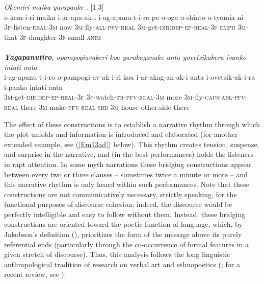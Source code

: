 \documentclass[output=paper]{LSP/langsci}
\begin{document}
\begin{exe}
\ex \label{Em03ab}
\begin{xlist}
\ex \label{Emex:03a}
\glt \textit{Okemiri maika yarapaake \underline{}}. [1.3]\\
\gll o-kem-i-ri maika i-ar-apa-ak-i i-ag-apanu-t-i-ro pe o-oga o-shinto o-tyomia-ni\\
 \textsc{3f-}listen\textsc{-real-3m} now \textsc{3m-}fly\textsc{-all-pfv-real} \textsc{3m-}get\textsc{-dir:dep-ep-real-3f} \textsc{emph} \textsc{3m-}that \textsc{3f-}daughter \textsc{3f-}small\textsc{-anim}\\
\glt {}\\
\ex \label{Emex:03b}
\glt \textit{\textbf{Yagapanutiro}, opampogiavakeri koa yarakaganake anta yovetsikakera ivanko intati anta}.\\
\gll i-ag-apanu-t-i-ro o-pampogi-av-ak-i-ri koa i-ar-akag-an-ak-i anta i-ovetsik-ak-i-ra i-panko intati anta \\     	      
   \textsc{3m-}get\textsc{-dir:dep-ep-real-3f} \textsc{3f-}watch\textsc{-tr-pfv-real-3m} more \textsc{3m-}fly\textsc{-caus-abl-pfv-real} there \textsc{3m-}make\textsc{-pfv-real-sbd} \textsc{3m-}house other.side there\\
\glt {}
\end{xlist}
\end{exe}
 
The effect of these constructions is to establish a narrative rhythm through which the plot unfolds and information is introduced and elaborated (for another extended example, see (\ref{Em13ad}) below). This rhythm creates tension, suspense, and surprise in the narrative, and (in the best performances) holds the listeners in rapt attention. In some myth narrations these bridging constructions appear between every two or three clauses – sometimes twice a minute or more – and this narrative rhythm is only heard within such performances. Note that these constructions are not communicatively necessary, strictly speaking, for the functional purposes of discourse cohesion; indeed, the discourse would be perfectly intelligible and easy to follow without them. Instead, these bridging constructions are oriented toward the poetic function of language, which, by Jakobson’s definition (\citeyear{jakobson60}), prioritizes the form of the message above its purely referential ends (particularly through the co-occurrence of formal features in a given stretch of discourse). Thus, this analysis follows the long linguistic anthropological tradition of research on verbal art and ethnopoetics (\citealt{bauman77,hymes81}; for a recent review, see \citealt{webster13}).
%
\end{document}
